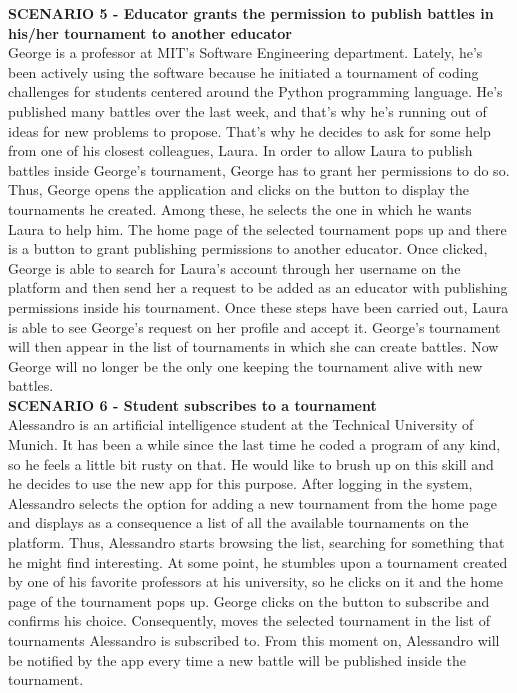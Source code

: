 	\textbf{SCENARIO 5 - Educator grants the permission to publish battles in his/her tournament to another educator}\\
	George is a professor at MIT's Software Engineering department. Lately, he's been actively using the \app software because he initiated a tournament of coding challenges for students centered around the Python programming language. He's published many battles over the last week, and that's why he's running out of ideas for new problems to propose. That's why he decides to ask for some help from one of his closest colleagues, Laura. In order to allow Laura to publish battles inside George's tournament, George has to grant her permissions to do so. Thus, George opens the \app application and clicks on the button to display the tournaments he created. Among these, he selects the one in which he wants Laura to help him. The home page of the selected tournament pops up and there is a button to grant publishing permissions to another educator. Once clicked, George is able to search for Laura's account through her username on the platform and then send her a request to be added as an educator with publishing permissions inside his tournament. Once these steps have been carried out, Laura is able to see George's request on her profile and accept it. George's tournament will then appear in the list of tournaments in which she can create battles. Now George will no longer be the only one keeping the tournament alive with new battles.\\

    \textbf{SCENARIO 6 - Student subscribes to a tournament}\\
    Alessandro is an artificial intelligence student at the Technical University of Munich. It has been a while since the last time he coded a program of any kind, so he feels a little bit rusty on that. He would like to brush up on this skill and he decides to use the new app \app for this purpose.
    After logging in the system, Alessandro selects the option for adding a new tournament from the home page and \app displays as a consequence a list of all the available tournaments on the platform. Thus, Alessandro starts browsing the list, searching for something that he might find interesting. 
    At some point, he stumbles upon a tournament created by one of his favorite professors at his university, so he clicks on it and the home page of the tournament pops up. George clicks on the button to subscribe and confirms his choice. Consequently, \app moves the selected tournament in the list of tournaments Alessandro is subscribed to.
    From this moment on, Alessandro will be notified by the \app app every time a new battle will be published inside the tournament.\\

